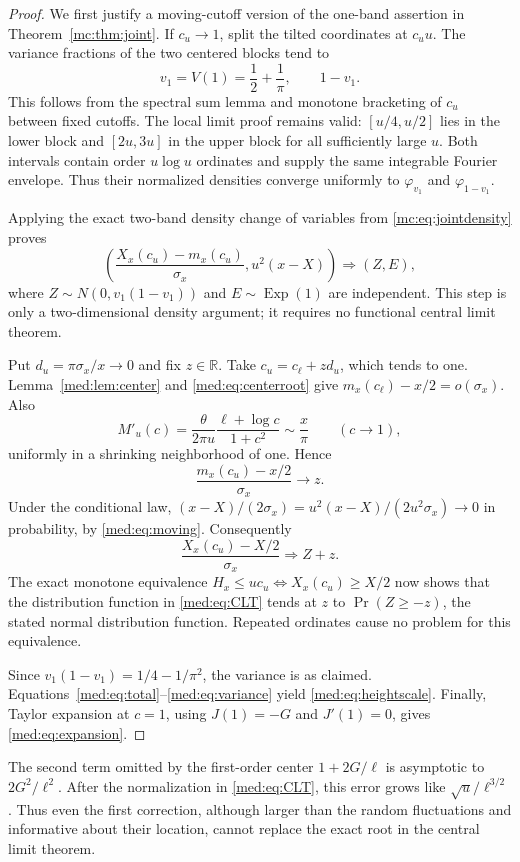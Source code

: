 \begin{proof}
We first justify a moving-cutoff version of the one-band assertion in
Theorem~\ref{mc:thm:joint}. If $c_u\to1$, split the tilted coordinates
at $c_uu$. The variance fractions of the two centered blocks tend to
\[
 v_1=V(1)=\frac12+\frac1\pi,\qquad 1-v_1.
\]
This follows from the spectral sum lemma and monotone bracketing of
$c_u$ between fixed cutoffs. The local limit proof remains valid:
$[u/4,u/2]$ lies in the lower block and $[2u,3u]$ in the upper block
for all sufficiently large $u$. Both intervals contain order
$u\log u$ ordinates and supply the same integrable Fourier envelope.
Thus their normalized densities converge uniformly to
$\varphi_{v_1}$ and $\varphi_{1-v_1}$.

Applying the exact two-band density change of variables from
\eqref{mc:eq:jointdensity} proves
\begin{equation}\label{med:eq:moving}
 \left(\frac{X_x(c_u)-m_x(c_u)}{\sigma_x},
              u^2(x-X)\right)
 \Longrightarrow (Z,E),
\end{equation}
where $Z\sim N(0,v_1(1-v_1))$ and $E\sim\operatorname{Exp}(1)$ are
independent. This step is only a two-dimensional density argument;
it requires no functional central limit theorem.

Put $d_u=\pi\sigma_x/x\to0$ and fix $z\in\mathbb R$. Take
$c_u=c_\ell+zd_u$, which tends to one. Lemma~\ref{med:lem:center} and
\eqref{med:eq:centerroot} give $m_x(c_\ell)-x/2=o(\sigma_x)$. Also
\[
 M'_u(c)=\frac{\theta}{2\pi u}
                  \frac{\ell+\log c}{1+c^2}
          \sim\frac{x}{\pi}\qquad(c\to1),
\]
uniformly in a shrinking neighborhood of one. Hence
\[
 \frac{m_x(c_u)-x/2}{\sigma_x}\longrightarrow z.
\]
Under the conditional law,
$(x-X)/(2\sigma_x)=u^2(x-X)/(2u^2\sigma_x)\to0$ in probability,
by \eqref{med:eq:moving}. Consequently
\[
 \frac{X_x(c_u)-X/2}{\sigma_x}\Longrightarrow Z+z.
\]
The exact monotone equivalence
$H_x\le uc_u\Longleftrightarrow X_x(c_u)\ge X/2$ now shows that the
distribution function in \eqref{med:eq:CLT} tends at $z$ to
$\Pr(Z\ge-z)$, the stated normal distribution function. Repeated
ordinates cause no problem for this equivalence.

Since $v_1(1-v_1)=1/4-1/\pi^2$, the variance is as claimed.
Equations~\eqref{med:eq:total}--\eqref{med:eq:variance} yield
\eqref{med:eq:heightscale}. Finally, Taylor expansion at $c=1$, using
$J(1)=-G$ and $J'(1)=0$, gives \eqref{med:eq:expansion}.
\end{proof}

The second term omitted by the first-order center
$1+2G/\ell$ is asymptotic to $2G^2/\ell^2$. After the normalization
in \eqref{med:eq:CLT}, this error grows like
$\sqrt u/\ell^{3/2}$. Thus even the first correction, although larger
than the random fluctuations and informative about their location,
cannot replace the exact root in the central limit theorem.

